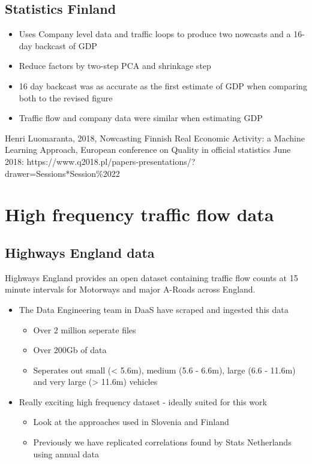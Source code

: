 \documentclass[11pt]{article}
\providecommand{\tightlist}{%
      \setlength{\itemsep}{0pt}\setlength{\parskip}{0pt}}
\begin{document}
    \subsection{Statistics Finland}\label{statistics-finland}

    \begin{itemize}
\tightlist
\item
  Uses Company level data and traffic loops to produce two nowcasts and
  a 16-day backcast of GDP
\item
  Reduce factors by two-step PCA and shrinkage step
\item
  16 day backcast was as accurate as the first estimate of GDP when
  comparing both to the revised figure
\item
  Traffic flow and company data were similar when estimating GDP
\end{itemize}

    Henri Luomaranta, 2018, Nowcasting Finnish Real Economic Activity: a
Machine Learning Approach, European conference on Quality in official
statistics June 2018:
https://www.q2018.pl/papers-presentations/?drawer=Sessions*Session\%2022

    \section{High frequency traffic flow
data}\label{high-frequency-traffic-flow-data}

    \subsection{Highways England data}\label{highways-england-data}

    Highways England provides an open dataset containing traffic flow counts
at 15 minute intervals for Motorways and major A-Roads across England.

\begin{itemize}
\tightlist
\item
  The Data Engineering team in DaaS have scraped and ingested this data

  \begin{itemize}
  \tightlist
  \item
    Over 2 million seperate files
  \item
    Over 200Gb of data
  \item
    Seperates out small (\textless{} 5.6m), medium (5.6 - 6.6m), large
    (6.6 - 11.6m) and very large (\textgreater{} 11.6m) vehicles
  \end{itemize}
\item
  Really exciting high frequency dataset - ideally suited for this work

  \begin{itemize}
  \tightlist
  \item
    Look at the approaches used in Slovenia and Finland
  \item
    Previously we have replicated correlations found by Stats
    Netherlands using annual data
  \end{itemize}
\end{itemize}
\end{document}

